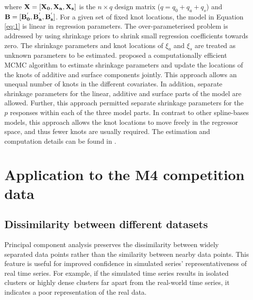 \documentclass[11pt,a4paper,]{article}
\begin{document}
where \(\bold{X=[X_0, X_a, X_s]}\) is the \(n \times q\) design matrix (\(q=q_0+q_a+q_s\)) and \(\bold{B=[B_0^{'}, B_a^{'}, B_s^{'}]}\). For a given set of fixed knot locations, the model in Equation \eqref{eq:1} is linear in regression parameters. The over-parameterised problem is addressed by using shrinkage priors to shrink small regression coefficients towards zero. The shrinkage parameters and knot locations of \(\xi_a\) and \(\xi_s\) are treated as unknown parameters to be estimated. \textcite{li2013efficient} proposed a computationally efficient MCMC algorithm to estimate shrinkage parameters and update the locations of the knots of additive and surface components jointly. This approach allows an unequal number of knots in the different covariates. In addition, separate shrinkage parameters for the linear, additive and surface parts of the model are allowed. Further, this approach permitted separate shrinkage parameters for the \(p\) responses within each of the three model parts. In contrast to other spline-bases models, this approach allows the knot locations to move freely in the regressor space, and thus fewer knots are usually required. The estimation and computation details can be found in \textcite{li2013efficient}.

\hypertarget{results}{%
\section{Application to the M4 competition data}\label{results}}

\hypertarget{dissimilarity-between-different-datasets}{%
\subsection{Dissimilarity between different datasets}\label{dissimilarity-between-different-datasets}}

Principal component analysis preserves the dissimilarity between widely separated data points rather than the similarity between nearby data points. This feature is useful for improved confidence in simulated series' representativeness of real time series. For example, if the simulated time series results in isolated clusters or highly dense clusters far apart from the real-world time series, it indicates a poor representation of the real data.
\end{document}
